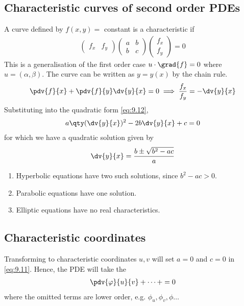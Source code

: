 \subsection{Characteristic curves of second order PDEs}
A curve defined by $f(x,y) =$ constant is a characteristic if
\begin{align} \label{eq:9.12}
	\begin{pmatrix}
		f_x & f_y
	\end{pmatrix} \begin{pmatrix}
		a & b \\
		b & c
	\end{pmatrix} \begin{pmatrix}
		f_x \\ f_y
	\end{pmatrix} = 0
\end{align}
This is a generalisation of the first order case $u \cdot \grad{f} = 0$ where $u = (\alpha, \beta)$.
The curve can be written as $y = y(x)$ by the chain rule.
\begin{align} \label{eq:9.13}
	\pdv{f}{x} + \pdv{f}{y} \dv{y}{x} = 0 \implies \frac{f_x}{f_y} = -\dv{y}{x}
\end{align}
Substituting into the quadratic form \cref{eq:9.12},
\begin{align*}
	a \qty(\dv{y}{x})^2 - 2b \dv{y}{x} + c = 0
\end{align*}
for which we have a quadratic solution given by
\begin{align} \label{eq:9.14}
	\dv{y}{x} = \frac{b \pm \sqrt{b^2 - ac}}{a}
\end{align}
\begin{enumerate}
	\item Hyperbolic equations have two such solutions, since $b^2 - ac > 0$.
	\item Parabolic equations have one solution.
	\item Elliptic equations have no real characteristics.
\end{enumerate}

\subsection{Characteristic coordinates}
Transforming to characteristic coordinates $u,v$ will set $a = 0$ and $c = 0$ in \cref{eq:9.11}.
Hence, the PDE will take the 
\begin{align} \label{eq:9.15}
	\pdv{\phi}{u}{v} + \dots + = 0
\end{align}
where the omitted terms are lower order, e.g. $\phi_u, \phi_v, \phi \dots$

